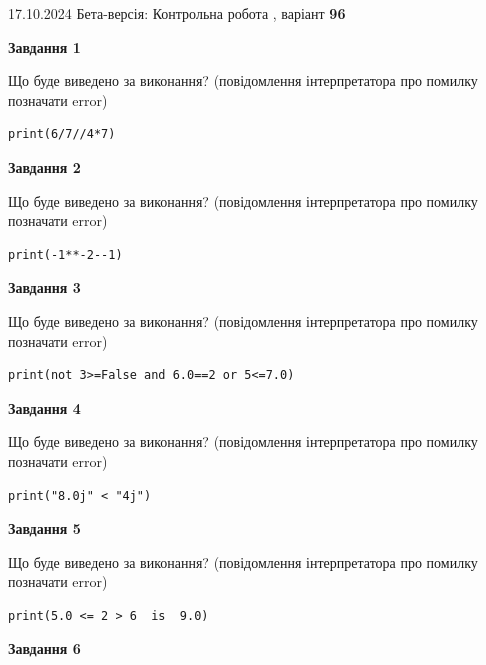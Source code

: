 \documentclass[12pt, ukrainian]{article}
\begin{document}
{\Large{17.10.2024 Бета-версія: Контрольна робота , варіант  \No \textbf { 96 }\par}}
{
\begin {large}
{\begin {center}\textbf{Завдання 1}\end {center}}

Що буде виведено за виконання? (повідомлення інтерпретатора про помилку позначати error)\par
\begin{verbatim}
print(6/7//4*7)
\end{verbatim}

{\begin {center}\textbf{Завдання 2}\end {center}}

Що буде виведено за виконання? (повідомлення інтерпретатора про помилку позначати error)\par
\begin{verbatim}
print(-1**-2--1)
\end{verbatim}

{\begin {center}\textbf{Завдання 3}\end {center}}

Що буде виведено за виконання? (повідомлення інтерпретатора про помилку позначати error)\par
\begin{verbatim}
print(not 3>=False and 6.0==2 or 5<=7.0)
\end{verbatim}

{\begin {center}\textbf{Завдання 4}\end {center}}

Що буде виведено за виконання? (повідомлення інтерпретатора про помилку позначати error)\par
\begin{verbatim}
print("8.0j" < "4j")
\end{verbatim}

{\begin {center}\textbf{Завдання 5}\end {center}}

Що буде виведено за виконання? (повідомлення інтерпретатора про помилку позначати error)\par
\begin{verbatim}
print(5.0 <= 2 > 6  is  9.0)
\end{verbatim}

{\begin {center}\textbf{Завдання 6}\end {center}}


\end{large}}
\end{document}
